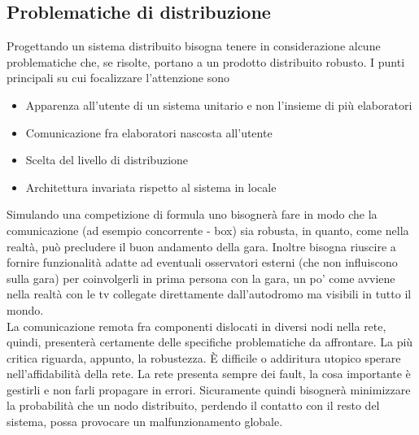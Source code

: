 \subsection{Problematiche di distribuzione}
Progettando un sistema distribuito bisogna tenere in considerazione alcune
problematiche che, se risolte, portano a un prodotto distribuito robusto.
I punti principali su cui focalizzare l'attenzione sono
\begin{itemize}
\item Apparenza all'utente di un sistema unitario e non l'insieme di pi\`{u}
elaboratori
\item Comunicazione fra elaboratori nascosta all'utente
\item Scelta del livello di distribuzione
\item Architettura invariata rispetto al sistema in locale
\end{itemize}
Simulando una competizione di formula uno bisognerà fare in modo che la comunicazione (ad esempio concorrente - box) sia robusta, 
in quanto, come nella realtà, può precludere il buon andamento della gara. Inoltre bisogna riuscire a fornire funzionalità 
adatte ad eventuali osservatori esterni (che non influiscono sulla gara) per coinvolgerli in prima persona con la gara, 
un po' come avviene nella realtà con le tv collegate direttamente dall'autodromo ma visibili in tutto il mondo. \\
La comunicazione remota fra componenti dislocati in diversi nodi nella rete, quindi, presenterà certamente delle
specifiche problematiche da affrontare. La pi\`{u} critica riguarda, appunto, la robustezza. \`{E} difficile o addiritura utopico sperare
nell'affidabilit\`{a} della rete. La rete presenta sempre dei fault, la cosa importante \`{e} gestirli e non farli propagare in errori. Sicuramente
quindi bisogner\`{a} minimizzare la probabilit\`{a} che un nodo distribuito, perdendo il contatto con il resto del sistema, possa provocare un 
malfunzionamento globale.
